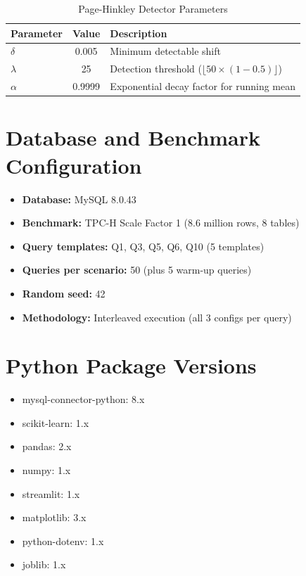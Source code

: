 \begin{appendices}
\begin{table}[htbp]
  \centering
  \caption{Page-Hinkley Detector Parameters}
  \label{tab:ph_params}
  \renewcommand{\arraystretch}{1.3}
  \begin{tabular}{|l|c|l|}
    \hline
    \textbf{Parameter} & \textbf{Value} & \textbf{Description} \\
    \hline
    $\delta$ & 0.005 & Minimum detectable shift \\
    $\lambda$ & 25   & Detection threshold ($\lfloor 50 \times (1-0.5) \rfloor$) \\
    $\alpha$  & 0.9999 & Exponential decay factor for running mean \\
    \hline
  \end{tabular}
\end{table}

\section*{Database and Benchmark Configuration}

\begin{itemize}[leftmargin=2em]
  \item \textbf{Database:} MySQL 8.0.43
  \item \textbf{Benchmark:} TPC-H Scale Factor 1 (8.6 million rows, 8 tables)
  \item \textbf{Query templates:} Q1, Q3, Q5, Q6, Q10 (5 templates)
  \item \textbf{Queries per scenario:} 50 (plus 5 warm-up queries)
  \item \textbf{Random seed:} 42
  \item \textbf{Methodology:} Interleaved execution (all 3 configs per query)
\end{itemize}

\section*{Python Package Versions}

\begin{itemize}[leftmargin=2em]
  \item mysql-connector-python: 8.x
  \item scikit-learn: 1.x
  \item pandas: 2.x
  \item numpy: 1.x
  \item streamlit: 1.x
  \item matplotlib: 3.x
  \item python-dotenv: 1.x
  \item joblib: 1.x
\end{itemize}

\end{appendices}
